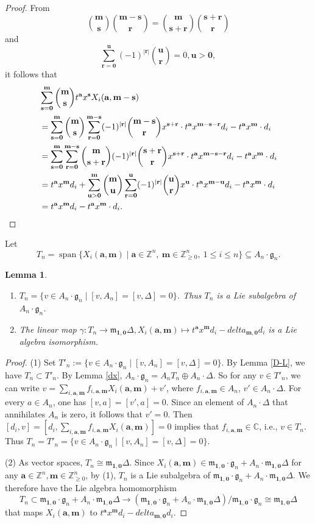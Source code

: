 \documentclass[12pt,a4paper]{amsart}
\def\mg{g}%
\def\delta{delta}%
\newtheorem{lemma}[theorem]{Lemma}%
\numberwithin{equation}{section}
\newcommand{\C}{\mathbb C}
\newcommand{\Z}{\mathbb{Z}}
\def\mg{\mathfrak{g}}
\def\mm{\mathfrak{m}}
\def\ba{\mathbf{a}}
\def\br{\mathbf{r}}
\def\bs{\mathbf{s}}
\def\bm{\mathbf{m}}
\def\b1{\mathbf{1}}
\def\bo{\mathbf{0}}
\def\bu{\mathbf{u}}
\begin{document}
\begin{proof}
From $$\binom{\bm}{\bs}
\binom{\bm-\bs}{\br}
=\binom{\bm}{\bs+\br}
\binom{\bs+\br}{\br}$$
and $$\sum_{\br=\bo}^{\bu} (-1)^{|\br|}\binom{\bu}{\br}=0, \bu>\bo,$$
it follows that
$$\aligned & \sum_{\bs=\bo}^{\bm} \binom{\bm}{\bs}t^{\ba}x^{\bs}X_i(\ba,\bm-\bs)\\
&= \sum_{\bs=\bo}^{\bm} \binom{\bm}{\bs}
\sum_{\br=\bo}^{\bm-\bs} (-1)^{|\br|}\binom{\bm-\bs}{\br}x^{\bs+\br}\cdot t^{\ba}x^{\bm-\bs-\br}d_{i}- t^{\ba}x^{\bm}\cdot d_{i}
\\
&= \sum_{\bs=\bo}^{\bm} \sum_{\br=\bo}^{\bm-\bs}\binom{\bm}{\bs+\br}
 (-1)^{|\br|}\binom{\bs+\br}{\br}x^{\bs+\br}\cdot t^{\ba}x^{\bm-\bs-\br}d_{i}
- t^{\ba}x^{\bm}\cdot d_{i}\\
&= t^{\ba}x^{\bm}d_{i}+\sum_{\bu>\bo}^{\bm} \binom{\bm}{\bu}
\sum_{\br=\bo}^{\bu} (-1)^{|\br|}\binom{\bu}{\br}x^{\bu}\cdot t^{\ba}x^{\bm-\bu}d_{i}- t^{\ba}x^{\bm}\cdot d_{i}
\\
&= t^{\ba}x^{\bm}d_{i}- t^{\ba}x^{\bm}\cdot d_{i}.
\endaligned$$
\end{proof}

Let
\[
T_n=\operatorname{span}\{X_i(\ba,\bm)\mid
\ba\in\Z^n,\ \bm\in\Z_{\geq0}^n,\ 1\leq i\leq n\}
\subseteq A_n\cdot\mg_n.
\]

\begin{lemma}\label{t-algebra}
\begin{enumerate}
\item $T_n=\{v\in A_n\cdot \mg_n\mid [v,A_n]=[v,\Delta]=0\}$. Thus
$T_n$ is a Lie subalgebra of $A_n\cdot \mg_n$.
\item The linear map $\gamma: T_n\rightarrow \mm_{\b1,\bo}\Delta,
X_i(\ba,\bm)\mapsto t^{\ba}x^{\bm}d_{i} -\delta_{\bm,\bo}d_i$ is a Lie algebra isomorphism.
\end{enumerate}
\end{lemma}

\begin{proof}
(1) Set $T'_n:=\{v\in A_n\cdot \mg_n\mid [v,A_n]=[v,\Delta]=0\}$. By
Lemma \ref{D-L}, we have $T_n\subset T'_n$. By Lemma \ref{dx}, $A_n\cdot \mg_n=A_n T_n\oplus A_n\cdot \Delta$.
So  for any $v\in T'_n$, we can write $v=\sum_{i,\ba,\bm} f_{i,\ba,\bm}X_i(\ba,\bm)+v'$, where $f_{i,\ba,\bm}\in A_n$,
$v'\in A_n\cdot \Delta$. For every \(a\in A_n\), one has
\([v,a]=[v',a]=0\). Since an element of \(A_n\cdot\Delta\) that
annihilates \(A_n\) is zero, it follows that \(v'=0\).
Then $[d_i,v]=[d_i,\sum_{i,\ba,\bm} f_{i,\ba,\bm}X_i(\ba,\bm)]=0$ implies that $f_{i,\ba,\bm}\in \C$, i.e., $v\in T_n$.
Thus $T_n=T'_n=\{v\in A_n\cdot \mg_n\mid [v,A_n]=[v,\Delta]=0\}$.

(2) As vector spaces, $T_n\cong\mm_{\b1,\bo}\Delta$. Since $X_i(\ba,\bm)\in \mm_{\b1,\bo}\cdot \mg_n+A_n\cdot \mm_{\b1,\bo}\Delta$ for any $\ba\in \Z^n, \bm\in\Z_{\geq 0}^n$, by (1), $T_n$ is a Lie subalgebra of $\mm_{\b1,\bo}\cdot\mg_n+A_n\cdot \mm_{\b1,\bo}\Delta$. We therefore have the Lie algebra homomorphism
$$T_n\subset\mm_{\b1,\bo}\cdot\mg_n+A_n\cdot \mm_{\b1,\bo}\Delta\rightarrow (\mm_{\b1,\bo}\cdot\mg_n+A_n\cdot \mm_{\b1,\bo}\Delta)/\mm_{\b1,\bo}\cdot\mg_n\cong\mm_{\b1,\bo}\Delta$$
that maps $X_i(\ba,\bm)$ to $t^{\ba}x^{\bm}d_{i} -\delta_{\bm,\bo}d_i$.
\end{proof}
\end{document}
